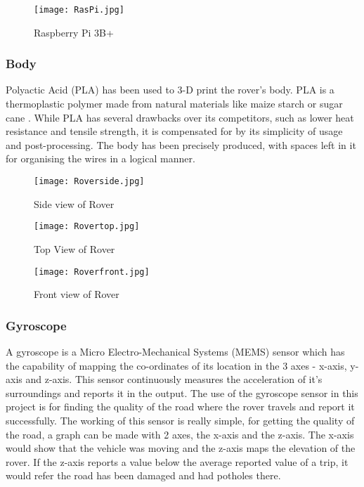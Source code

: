 \documentclass[conference,a4paper]{IEEEtran}
\begin{document}
\begin{figure}[ht]
\centering
\texttt{[image: RasPi.jpg]}
\caption{Raspberry Pi 3B+ \cite{4}}
\label{Fig: Pi}
\end{figure}

\subsubsection{Body}
Polyactic Acid (PLA) has been used to 3-D print the rover's body. PLA is a thermoplastic polymer made from natural materials like maize starch or sugar cane \cite{20}. While PLA has several drawbacks over its competitors, such as lower heat resistance and tensile strength, it is compensated for by its simplicity of usage and post-processing. The body has been precisely produced, with spaces left in it for organising the wires in a logical manner.

\begin{figure}[ht]
\centering
\texttt{[image: Roverside.jpg]}
\caption{Side view of Rover}
\label{Fig: Rover Side}
\end{figure}

\begin{figure}[ht]
\centering
\texttt{[image: Rovertop.jpg]}
\caption{Top View of Rover}
\label{Fig: Rover Top}
\end{figure}

\begin{figure}[ht]
\centering
\texttt{[image: Roverfront.jpg]}
\caption{Front view of Rover}
\label{Fig: Rover Front}
\end{figure}

\subsubsection{Gyroscope}
A gyroscope is a Micro Electro-Mechanical Systems (MEMS) sensor which has the capability of mapping the co-ordinates of its location in the 3 axes - x-axis, y-axis and z-axis. This sensor continuously measures the acceleration of it's surroundings and reports it in the output.
The use of the gyroscope sensor in this project is for finding the quality of the road where the rover travels and report it successfully. \cite{13} The working of this sensor is really simple, for getting the quality of the road, a graph can be made with 2 axes, the x-axis and the z-axis. The x-axis would show that the vehicle was moving and the z-axis maps the elevation of the rover. If the z-axis reports a value below the average reported value of a trip, it would refer the road has been damaged and had potholes there.
\end{document}
